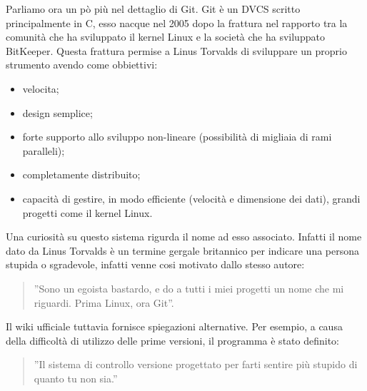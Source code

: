 Parliamo ora un pò più nel dettaglio di Git. Git è un DVCS scritto principalmente in C, esso nacque nel 2005 dopo la frattura nel rapporto tra la comunità che ha sviluppato il kernel Linux e la società che ha sviluppato BitKeeper. Questa frattura permise a Linus Torvalds di sviluppare un proprio strumento avendo come obbiettivi:

\begin{itemize}
\item velocita;
\item design semplice;
\item forte supporto allo sviluppo non-lineare (possibilità di migliaia di rami paralleli);
\item completamente distribuito;
\item capacità di gestire, in modo efficiente (velocità e dimensione dei dati), grandi progetti come il kernel Linux.
\end{itemize}

Una curiosità su questo sistema rigurda il nome ad esso associato. Infatti il nome dato da Linus Torvalds è un termine gergale britannico per indicare una persona stupida o sgradevole, infatti venne cosi motivato dallo stesso autore:

\begin{quotation}
''Sono un egoista bastardo, e do a tutti i miei progetti un nome che mi riguardi. Prima Linux, ora Git''.
\end{quotation}

Il wiki ufficiale tuttavia fornisce spiegazioni alternative. Per esempio, a causa della difficoltà di utilizzo delle prime versioni, il programma è stato definito:

\begin{quotation}
''Il sistema di controllo versione progettato per farti sentire più stupido di quanto tu non sia.''
\end{quotation}
